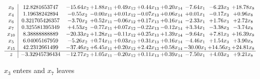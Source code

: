 \documentclass[9pt]{article}
\begin{document}
 \[\begin{array}{c| c c@{\hskip 2pt} c@{\hskip 2pt} c@{\hskip 2pt} c@{\hskip 2pt} c@{\hskip 2pt} c@{\hskip 2pt} c@{\hskip 2pt} c@{\hskip 2pt} }
 x_{9}   &  12.8281653747 & -15.64 x_{2} & +  1.88 x_{11} & +  0.49 x_{12} & +  0.44 x_{13} & +  0.20 x_{14} & -7.64 x_{1} & -6.23 x_{3} & + 18.78 x_{8}\\
 x_{4}   &  1.19638242894 & -0.55 x_{2} & -0.00 x_{11} & +  0.01 x_{12} & -0.07 x_{13} & +  0.06 x_{14} & +  0.01 x_{1} & -0.17 x_{3} & +  0.96 x_{8}\\
 x_{6}   &  0.321705426357 & -3.70 x_{2} & +  0.52 x_{11} & -0.06 x_{12} & +  0.17 x_{13} & +  0.16 x_{14} & -2.33 x_{1} & +  1.76 x_{3} & +  2.72 x_{8}\\
 x_{7}   &  0.325581395349 & +  4.53 x_{2} & -0.77 x_{11} & +  0.07 x_{12} & -0.22 x_{13} & -0.12 x_{14} & +  3.34 x_{1} & -3.38 x_{3} & -3.74 x_{8}\\
 x_{10}   &  8.38888888889 & -20.33 x_{2} & +  1.28 x_{11} & -0.11 x_{12} & +  0.25 x_{13} & +  1.39 x_{14} & -9.64 x_{1} & +  7.81 x_{3} & + 16.39 x_{8}\\
 x_{5}   &  6.04005167959 & -5.26 x_{2} & +  0.74 x_{11} & +  0.03 x_{12} & +  0.31 x_{13} & +  0.16 x_{14} & -4.46 x_{1} & +  1.54 x_{3} & +  3.90 x_{8}\\
 x_{15}   &  42.2312661499 & -37.46 x_{2} & +  6.45 x_{11} & +  0.20 x_{12} & +  2.42 x_{13} & +  0.58 x_{14} & -30.00 x_{1} & + 14.56 x_{3} & + 24.81 x_{8}\\
\hline
z    &  -3.32945736434 & -12.77 x_{2} & +  1.05 x_{11} & -0.20 x_{12} & +  0.11 x_{13} & +  0.39 x_{14} & -7.50 x_{1} & +  4.03 x_{3} & +  9.21 x_{8}\\
\end{array}\]


 $ x_{3} $ enters and $ x_{7} $ leaves 
\end{document}

